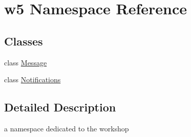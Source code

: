 \hypertarget{namespacew5}{}\section{w5 Namespace Reference}
\label{namespacew5}
\subsection*{Classes}
\begin{DoxyCompactItemize}
\item 
class \mbox{\hyperlink{classw5_1_1_message}{Message}}
\item 
class \mbox{\hyperlink{classw5_1_1_notifications}{Notifications}}
\end{DoxyCompactItemize}


\subsection{Detailed Description}
a namespace dedicated to the workshop 